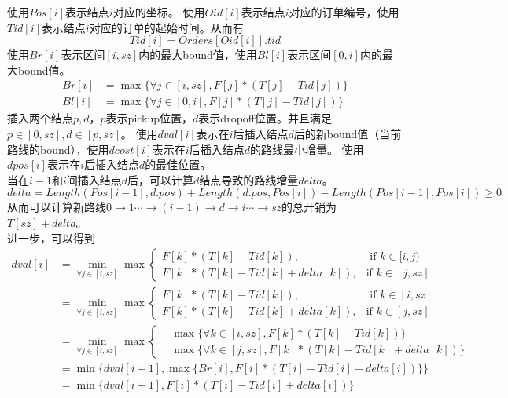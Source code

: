 \documentclass[hyperref,UTF8]{ctexart}
\theoremstyle{definition}
\theoremstyle{remark}
\numberwithin{equation}{subsection}
\begin{document}
使用$Pos[i]$表示结点$i$对应的坐标。
使用$Oid[i]$表示结点$i$对应的订单编号，使用$Tid[i]$表示结点$i$对应的订单的起始时间。从而有
\[
    Tid[i] = Orders[Oid[i]].tid
\]
使用$Br[i]$表示区间$[i,sz]$内的最大bound值，使用$Bl[i]$表示区间$[0,i]$内的最大bound值。
\begin{align*}
    Br[i] &= \max\{\forall j\in[i,sz], F[j]*(T[j] - Tid[j])\} \\
    Bl[i] &= \max\{\forall j\in[0,i], F[j]*(T[j] - Tid[j])\}
\end{align*}
插入两个结点$p,d$，$p$表示pickup位置，$d$表示dropoff位置。并且满足$p \in [0,sz], d \in [p,sz]$。
使用$dval[i]$表示在$i$后插入结点$d$后的新bound值（当前路线的bound），使用$dcost[i]$表示在$i$后插入结点$d$的路线最小增量。
使用$dpos[i]$表示在$i$后插入结点$d$的最佳位置。\\
当在$i-1$和$i$间插入结点$d$后，可以计算$d$结点导致的路线增量$delta$。
\[
    delta = Length(Pos[i-1], d.pos) + Length(d.pos, Pos[i]) - Length(Pos[i-1], Pos[i]) \ge 0
\]
从而可以计算新路线$0 \rightarrow 1 \cdots \rightarrow (i-1) \rightarrow d \rightarrow i \cdots \rightarrow sz$的总开销为
$T[sz] + delta$。\\
进一步，可以得到
\begin{align*}
    dval[i] &= \min_{\forall j\in[i,sz]}
        \max \left\{
            \begin{aligned}
                F[k]*(T[k]-Tid[k]), &\text{ if } k \in [i,j) \\
                F[k]*(T[k]-Tid[k]+delta[k]), &\text{if } k \in [j, sz]
            \end{aligned}
        \right .    \\
            &= \min_{\forall j\in[i,sz]}
		\max \left\{
            \begin{aligned}
                F[k]*(T[k]-Tid[k]), &\text{ if } k \in [i,sz] \\
                F[k]*(T[k]-Tid[k]+delta[k]), &\text{if } k \in [j, sz]
            \end{aligned}
        \right .    \\
			&= \min_{\forall j\in[i,sz]}
		\max \left\{
			\begin{aligned}
				&\max \{\forall k\in[i,sz], F[k]*(T[k]-Tid[k])\} \\
				&\max \{\forall k\in[j,sz], F[k]*(T[k]-Tid[k]+delta[k])\}
			\end{aligned}
		\right . 	\\
			&= \min \{dval[i+1], \max\{Br[i], F[i]*(T[i]-Tid[i]+delta[i])\} \} \\
			&= \min \{dval[i+1], F[i]*(T[i]-Tid[i]+delta[i])\} \\
\end{align*}
\end{document}
